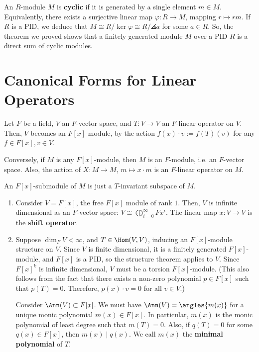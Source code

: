 \begin{defn}
    An $R$-module $M$ is \textbf{cyclic} if it is generated by a single element $m \in M$. Equivalently, there exists a surjective linear map $\varphi:R \to M$, mapping $r \mapsto rm$. If $R$ is a PID, we deduce that $M \cong R / \ker \varphi \cong R/\angles a$ for some $a \in R$. So, the theorem we proved shows that a finitely generated module $M$ over a PID $R$ is a direct sum of cyclic modules.
\end{defn}

\section{Canonical Forms for Linear Operators}

Let $F$ be a field, $V$ an $F$-vector space, and $T:V  \to V$ an $F$-linear operator on $V$. Then, $V$ becomes an $F[x]$-module, by the action $f(x) \cdot v := f(T)(v)$ for any $f \in F[x], v \in V$.

Conversely, if $M$ is any $F[x]$-module, then $M$ is an $F$-module, i.e. an $F$-vector space. Also, the action of $X : M \to M$, $m \mapsto x \cdot m$ is an $F$-linear operator on $M$.

\begin{rmk}
    An $F[x]$-submodule of $M$ is just a $T$-invariant subspace of $M$.
\end{rmk}

\begin{ex}
    \begin{enumerate}
        \item Consider $V= F[x]$, the free $F[x]$ module of rank $1$. Then, $V$ is infinite dimensional as an $F$-vector space: $V \cong \bigoplus_{i=0}^\infty Fx^i$. The linear map $x : V \to V$ is the \textbf{shift operator}.
        \item Suppose $\dim _FV < \infty$, and $T \in \Hom (V,V)$, inducing an $F[x]$-module structure on $V$. Since $V$ is finite dimensional, it is a finitely generated $F[x]$-module, and $F[x]$ is a PID, so the structure theorem applies to $V$. Since $F[x]^k$ is infinite dimensional, $V$ must be a torsion $F[x]$-module. (This also follows from the fact that there exists a non-zero polynomial $p \in F[x]$ such that $p(T)=0$. Therefore, $p(x) \cdot v =0$ for all $v \in V$.)

        Consider $\Ann(V) \subset F[x]$. We must have $\Ann(V)  = \angles{m(x)}$ for a unique monic polynomial $m(x) \in F[x]$. In particular, $m(x)$ is the monic polynomial of least degree such that $m(T)=0$. Also, if $q(T)=0$ for some $q(x) \in F[x]$, then $m(x) \mid q(x)$. We call $m(x)$ the \textbf{minimal polynomial} of $T$.
    \end{enumerate}
\end{ex}

